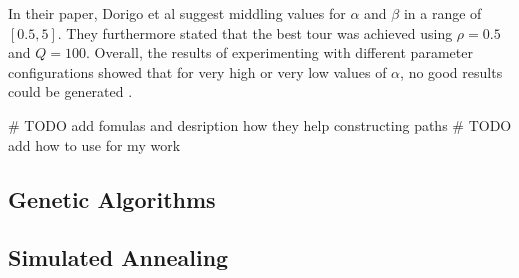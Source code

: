 In their paper, Dorigo et al suggest middling values for $\alpha$ and $\beta$ in a range of $[0.5,5]$.
They furthermore stated that the best tour was achieved using $\rho = 0.5$ and $Q=100$.
Overall, the results of experimenting with different parameter configurations showed that for very high or very low values of $\alpha$, no good results could be generated \cite{dorigo_ant_1996}.



\# TODO add fomulas and desription how they help constructing paths
\# TODO add how to use for my work

\subsection{Genetic Algorithms}
\label{subsec:geneticAlgorithmsBackground}

\subsection{Simulated Annealing}
\label{subsec:simulatedAnnealingBackground}